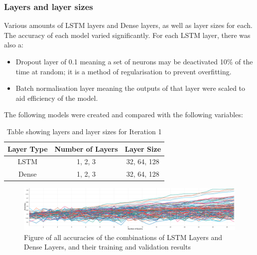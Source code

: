 \subsubsection{Layers and layer sizes}
Various amounts of LSTM layers and Dense layers, as well as layer sizes for each. The accuracy of each model varied
significantly. For each LSTM layer, there was also a:
\begin{itemize}
    \item Dropout layer of 0.1 meaning a set of neurons may be
    deactivated 10\% of the time at random; it is a method of regularisation to prevent overfitting.
    \item Batch normalisation layer meaning the outputs of that layer were scaled to aid efficiency of the model.
\end{itemize}
The following models were created and compared with the following variables:

\begin{table}[h]
    \centering
    \begin{tabular}{|c|c|c|}
        \hline
        Layer Type & Number of Layers & Layer Size \\
        \hline\hline
        LSTM & 1, 2, 3 & 32, 64, 128 \\
        Dense & 1, 2, 3 & 32, 64, 128 \\
        \hline
    \end{tabular}
    \caption{Table showing layers and layer sizes for Iteration 1}
    \label{tab:iteration1_layers}
\end{table}
\FloatBarrier

\begin{figure}[h]
    \centering
    \includegraphics[width=\columnwidth]{figures/results/iteration1_all_accuracy.pdf}
    \caption[Figure of accuracies of various layer variables for Iteration 1]{Figure of all accuracies of the combinations of LSTM Layers and Dense Layers, and their training and validation results}
    \label{fig:iteration1_all_accuracy}
\end{figure}

